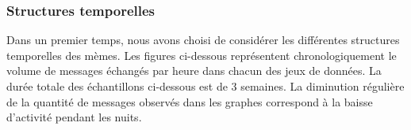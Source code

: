 \subsubsection[Structures temporelles]{Structures temporelles}
Dans un premier temps, nous avons choisi de consid\'erer les
diff\'erentes structures temporelles des m\`emes. Les figures
ci-dessous repr\'esentent chronologiquement le volume de messages
\'echang\'es par heure dans chacun des jeux de donn\'ees. La dur\'ee
totale des \'echantillons ci-dessous est de 3 semaines. La diminution
r\'eguli\`ere de la quantit\'e de messages observ\'es dans les graphes
correspond \`a la baisse d{\textquoteright}activit\'e pendant les
nuits.

\begin{figure}[ht]
    \centering
    \newline
    \newline
\end{figure}
